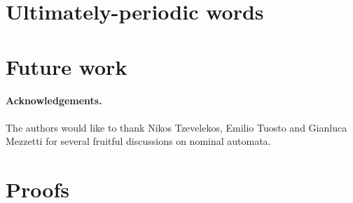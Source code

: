 \documentclass[orivec]{llncs}
\begin{document}
\section{Ultimately-periodic words}\label{sec:up-words}



\section{Future work}\label{sec:future-work}



\paragraph{Acknowledgements.} The authors would like to thank Nikos Tzevelekos, Emilio Tuosto and Gianluca Mezzetti for several fruitful discussions on nominal automata.





\appendix
\section{Proofs}

\end{document}
